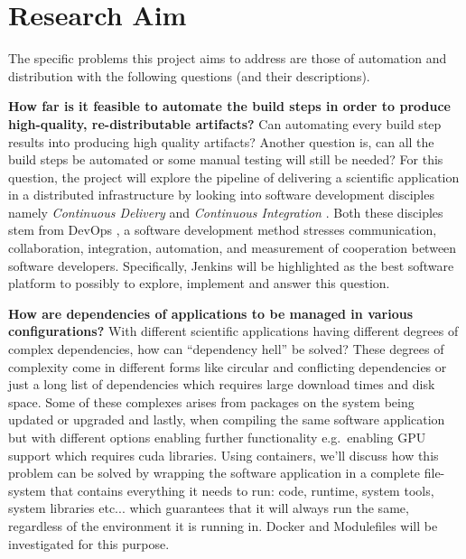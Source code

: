 \documentclass [titlepage,11pt]{article}
\begin{document}
\section{Research Aim}
The specific problems this project aims to address are those of automation and distribution with the following questions (and their descriptions).  \\
\begin{description}

\item \textbf{How far is it feasible to automate the build steps in order to produce high-quality, re-distributable artifacts?} Can automating every build step results into producing high quality artifacts? Another question is, can all the build steps be automated or some manual testing will still be needed? For this question, the project will explore the pipeline of delivering a scientific application in a distributed infrastructure by looking into software development disciples namely \emph{Continuous Delivery} \cite{delivery15} and \emph{Continuous Integration} \citep{fowler06}. Both these disciples stem from DevOps \citep{wikiOps}, a software development method  stresses communication, collaboration, integration, automation, and measurement of cooperation between software developers. Specifically, Jenkins will be highlighted as the best software platform to possibly to explore, implement and answer this question. \\

\item \textbf{How are dependencies of applications to be managed in various configurations?} With different scientific applications having different degrees of complex dependencies, how can ``dependency hell''\citep{dependency} be solved? These degrees of complexity come in different forms like circular and conflicting dependencies or just a long list of dependencies which requires large download times and disk space. Some of these complexes arises from packages on the system being updated or upgraded and lastly, when compiling the same software application but with different options enabling further functionality e.g.\ enabling GPU support which requires cuda libraries. Using containers, we'll discuss how this problem can be solved by wrapping the software application in a complete file-system that contains everything it needs to run: code, runtime, system tools, system libraries etc... which guarantees that it will always run the same, regardless of the environment it is running in. Docker \citep{dockerWeb} and Modulefiles \citep{module} will be investigated for this purpose. \\


\end{description}
\end{document}
